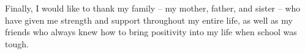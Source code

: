Finally, I would like to thank my family -- my mother, father, and sister -- who have given me strength and support throughout my entire life, as well as my friends who always knew how to bring positivity into my life when school was tough. 

\begin{comment}
I owe my gratitude to all the people who have made this thesis possible and because of whom my graduate experience has been one that I will cherish forever.

First and foremost I'd like to thank my advisor, Professor Rajarshi Roy for giving me an invaluable opportunity to work on challenging and extremely interesting projects over the past four years. He has always made himself available for help and advice and there has never been an occasion when I've knocked on his door and he hasn't given me time. It has been a pleasure to work with and learn from such an extraordinary individual.

I would also like to thank my co-advisor, Dr. Parvez Guzdar. Without his extraordinary theoretical ideas and computational expertise, this thesis would have been a distant dream. Thanks are due to Professor Robert Gammon, Professor Edward Ott and Professor Thomas Antonsen for agreeing to serve on my thesis committee and for sparing their invaluable time reviewing the manuscript.

My colleagues at the nonlinear optics laboratory have enriched my graduate life in many ways and deserve a special mention. David DeShazer helped me start-off by rewriting the basic simulation code in a user-friendly format. Christian Silva provided help by setting up the GRENOUILLE apparatus and performing some of the simulations. My interaction with  Rohit Tripathi, Ryan McAllister, Vasily Dronov, Min-Young Kim, Elizabeth Rogers, William Ray, Jordi Garcia Ojalvo, Riccardo Meucci, Atsushi Uchida, and Fabian Rogister has been very fruitful. I'd also like to thank Wing-Shun Lam and Benjamin Zeff for providing the LaTex style files for writing this thesis.

I would also like to acknowledge help and support from some of the staff members. Donald Martin's technical help is highly appreciated, as is the computer hardware support from Edward Condon, LaTex and software help from Dorothea Brosius and purchasing help from Nancy Boone.

I owe my deepest thanks to my family - my mother and father who have always stood by me and guided me through my career, and have pulled me through against impossible odds at times. Words cannot express the gratitude I owe them. I would also like to thank Dr. Mohan Advani, Dr. Vasudeo Paralikar and Dr. Vinod Chaugule who are like family members to me.


\end{comment}
